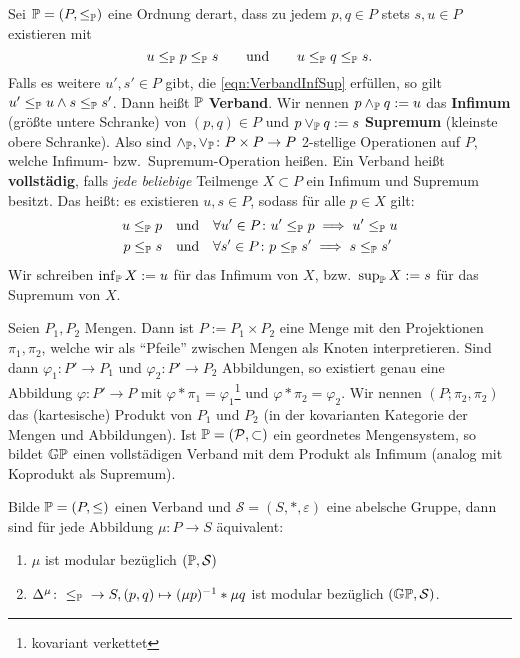 \begin{definition}[Verband]
    Sei $\P = (P, \leq_\P)$ eine Ordnung derart, dass zu jedem $p,q\in P$ stets $s, u\in P$ existieren mit
    \begin{equation}
        \label{eqn:VerbandInfSup}
        u \leq_\P p \leq_\P s \qquad\text{und}\qquad u \leq_\P q \leq_\P s.
    \end{equation}
    Falls es weitere $u', s'\in P$ gibt, die \eqref{eqn:VerbandInfSup} erfüllen, so gilt $u'\leq_\P u \land s \leq_\P s'$.
    Dann heißt $\P$ \textbf{Verband}.
    Wir nennen $p\land_\P q := u$ das \textbf{Infimum} (größte untere Schranke) von $(p, q) \in P$ und $p \lor_\P q := s$ \textbf{Supremum} (kleinste obere Schranke).
    Also sind $\land_\P, \lor_\P\colon P\times P\to P$ 2-stellige Operationen auf $P$, welche Infimum- bzw.~Supremum-Operation heißen.
    Ein Verband heißt \textbf{vollstädig}, falls \emph{jede beliebige} Teilmenge $X\subset P$ ein Infimum und Supremum besitzt.
    Das heißt: es existieren $u, s\in P$, sodass für alle $p\in X$ gilt:
    \begin{align}
            u\leq_\P p
            &\quad\text{und}\quad
            \forall u'\in P\colon u'\leq_\P p\implies u'\leq_\P u \\
            p\leq_\P s
            &\quad\text{und}\quad
            \forall s'\in P\colon p\leq_\P s'\implies s\leq_\P s'
    \end{align}
    Wir schreiben $\inf_\P X := u$ für das Infimum von $X$, bzw.~$\sup_\P X := s$ für das Supremum von $X$.
    \begin{beispiel}
        Seien $P_1, P_2$ Mengen.
        Dann ist $P := P_1\times P_2$ eine Menge mit den Projektionen $\pi_1, \pi_2$, welche wir als \enquote{Pfeile} zwischen Mengen als Knoten interpretieren.
        Sind dann $\varphi_1\colon P'\to P_1$ und $\varphi_2\colon P'\to P_2$ Abbildungen,
        so existiert genau eine Abbildung $\varphi\colon P'\to P$ mit $\varphi * \pi_1 = \varphi_1$\footnote{kovariant verkettet} und $\varphi * \pi_2 = \varphi_2$.
        Wir nennen $(P; \pi_2, \pi_2)$ das (kartesische) Produkt von $P_1$ und $P_2$ (in der kovarianten Kategorie der Mengen und Abbildungen).
        Ist $\P = (\mathcal{P}, \subset)$ ein geordnetes Mengensystem,
        so bildet $\G\P$ einen vollstädigen Verband mit dem Produkt als Infimum
        (analog mit Koprodukt als Supremum).
    \end{beispiel}
\end{definition}
\begin{proposition}
    Bilde $\P = (P, \leq)$ einen Verband und $\mathcal{S} = (S,\ast,\varepsilon)$ eine abelsche Gruppe, dann sind für jede Abbildung $\mu: P \to S$ äquivalent:
    \begin{enumerate}[label=(\alph*)]
        \item $\mu$ ist modular bezüglich $(\P,\mathcal{S})$
        \item $\Delta^\mu\colon {}\leq_\P{} \to S, (p,q) \mapsto (\mu p)^{-1} \ast \mu q$ ist modular bezüglich $(\G\P,\mathcal{S})$.
    \end{enumerate}
\end{proposition}

